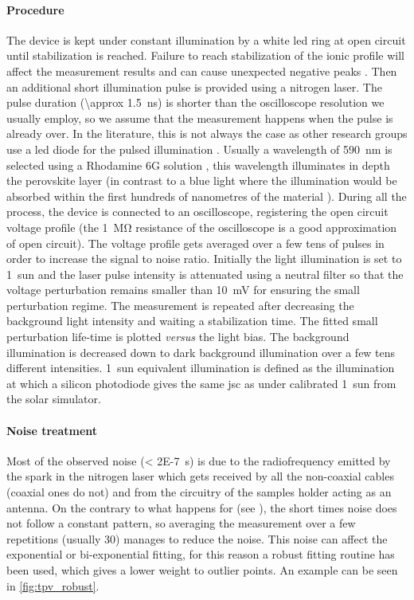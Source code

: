 	\paragraph{Procedure}
	The device is kept under constant illumination by a white \gls{led} ring at open circuit until stabilization is reached.
	Failure to reach stabilization of the ionic profile will affect the measurement results \cite{ORegan2015b} and can cause unexpected negative  peaks \cite{Calado2016}.
	Then an additional short illumination pulse is provided using a nitrogen laser.
	The pulse duration (\SI{\approx 1.5}{\ns}) is shorter than the oscilloscope resolution we usually employ, so we assume that the measurement happens when the pulse is already over.
	In the literature, this is not always the case as other research groups use a \gls{led} diode for the pulsed illumination \cite{Calado2016}.
	Usually a wavelength of \SI{590}{\nm} is selected using a Rhodamine 6G solution \cite{RadiantDyesLaser}, this wavelength illuminates in depth the perovskite layer (in contrast to a blue light where the illumination would be absorbed within the first hundreds of nanometres of the material \cite{Bi2016,Tress2016}).
	During all the process, the device is connected to an oscilloscope, registering the open circuit voltage profile (the \SI{1}{\Mohm} resistance of the oscilloscope is a good approximation of open circuit).
	The voltage profile gets averaged over a few tens of pulses in order to increase the signal to noise ratio.
	Initially the light illumination is set to \SI{1}{sun} and the laser pulse intensity is attenuated using a neutral filter so that the voltage perturbation remains smaller than \SI{10}{\mV} for ensuring the small perturbation regime.
	The measurement is repeated after decreasing the background light intensity and waiting a stabilization time.
	The fitted small perturbation life\hyp{}time is plotted \textsl{versus} the light bias.
	The background illumination is decreased down to dark background illumination over a few tens different intensities.
	1~sun equivalent illumination is defined as the illumination at which a silicon photodiode gives the same \gls{jsc} as under calibrated 1~sun from the solar simulator.

	\paragraph{Noise treatment}\label{tpv_robust}
	Most of the observed noise (\SI{< 2E-7}{\s}) is due to the radiofrequency emitted by the spark in the nitrogen laser which gets received by all the non\hyp{}coaxial cables (coaxial ones do not) and from the circuitry of the samples holder acting as an antenna.
	On the contrary to what happens for  (see ), the short times noise does not follow a constant pattern, so averaging the measurement over a few repetitions (usually 30) manages to reduce the noise.
	This noise can affect the exponential or bi\hyp{}exponential fitting, for this reason a robust fitting routine has been used, which gives a lower weight to outlier points.
	An example can be seen in \cref{fig:tpv_robust}.

